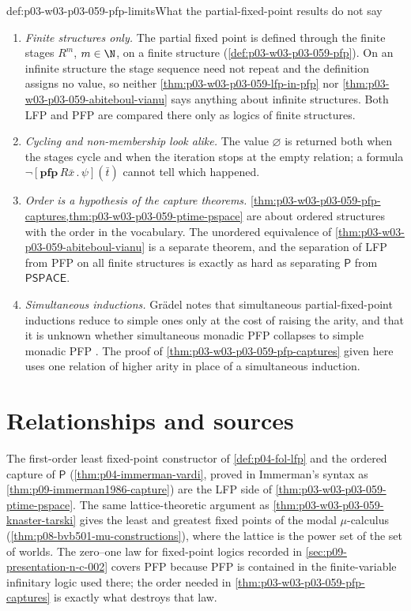 \begin{hbwarning}{def:p03-w03-p03-059-pfp-limits}{What the partial-fixed-point results do not say}
\begin{enumerate}
 \item \emph{Finite structures only.} The partial fixed point is defined
       through the finite stages \(R^m\), \(m\in\N\), on a finite
       structure (\cref{def:p03-w03-p03-059-pfp}). On an infinite
       structure the stage sequence need not repeat and the definition
       assigns no value, so neither \cref{thm:p03-w03-p03-059-lfp-in-pfp}
       nor \cref{thm:p03-w03-p03-059-abiteboul-vianu} says anything about
       infinite structures. Both LFP and PFP are compared there only as
       logics of finite structures.
 \item \emph{Cycling and non-membership look alike.} The value
       \(\varnothing\) is returned both when the stages cycle and when the
       iteration stops at the empty relation; a formula
       \(\neg[\mathbf{pfp}\,R\bar x\,.\,\psi](\bar t)\) cannot tell which
       happened.
 \item \emph{Order is a hypothesis of the capture theorems.}
       \cref{thm:p03-w03-p03-059-pfp-captures,thm:p03-w03-p03-059-ptime-pspace}
       are about ordered structures with the order in the vocabulary. The
       unordered equivalence of \cref{thm:p03-w03-p03-059-abiteboul-vianu}
       is a separate theorem, and the separation of LFP from PFP on all
       finite structures is exactly as hard as separating
       \(\mathsf P\) from \(\mathsf{PSPACE}\).
 \item \emph{Simultaneous inductions.} Gr\"adel notes that simultaneous
       partial-fixed-point inductions reduce to simple ones only at the cost
       of raising the arity, and that it is unknown whether simultaneous
       monadic PFP collapses to simple monadic PFP
       \cite[p.~178]{Gradel2007FMTDescriptiveChapter}. The proof of
       \cref{thm:p03-w03-p03-059-pfp-captures} given here uses one
       relation of higher arity in place of a simultaneous induction.
\end{enumerate}
\end{hbwarning}

\section{Relationships and sources}
\label{sec:p03-w03-p03-059-relationships}

The first-order least fixed-point constructor of \cref{def:p04-fol-lfp} and
the ordered capture of \(\mathsf P\) (\cref{thm:p04-immerman-vardi}, proved
in Immerman's syntax as \cref{thm:p09-immerman1986-capture}) are the LFP
side of \cref{thm:p03-w03-p03-059-ptime-pspace}. The same lattice-theoretic
argument as \cref{thm:p03-w03-p03-059-knaster-tarski} gives the least and
greatest fixed points of the modal \(\mu\)-calculus
(\cref{thm:p08-bvb501-mu-constructions}), where the lattice is the power set
of the set of worlds. The zero--one law for fixed-point logics recorded in
\cref{sec:p09-presentation-n-c-002} covers PFP because PFP is contained in
the finite-variable infinitary logic used there; the order needed in
\cref{thm:p03-w03-p03-059-pfp-captures} is exactly what destroys that law.

